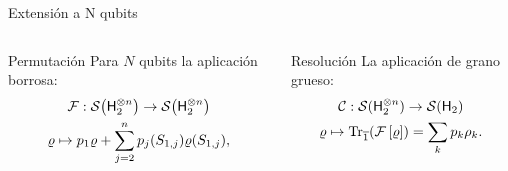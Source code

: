 \begin{frame}{Extensión a N qubits}
    \begin{columns}
        \begin{column}{0.5\textwidth}
            \begin{block}{Permutación}
            Para $N$ qubits la aplicación borrosa\pause:
            \begin{equation}
                \begin{gathered}
                \mathcal{F}:\mathcal{S}\qty( {\sf H}_{2}^{\otimes n})\to \mathcal{S}\qty( {\sf H}_{2}^{\otimes n})\nonumber\\
                \varrho \mapsto p_{1}\varrho+\sum_{j=2}^{n}p_{j}(S_{1,j})\varrho(S_{1,j}),\nonumber
            \end{gathered}\nonumber
        \end{equation}
    \end{block}
        \end{column}
        \pause
        \begin{column}{0.5\textwidth}
            \begin{block}{Resolución}
        La aplicación de grano grueso\pause:
        \begin{equation}
            \begin{gathered}
                \mathcal{C}:\mathcal{S}( {\sf H}_{2}^{\otimes n})\to \mathcal{S}({\sf H}_{2})\\
                \varrho\mapsto\Tr_{\overline{1}}(\mathcal{F}\left[\varrho\right]) = \sum_{k}p_{k}\rho_{k}.
            \end{gathered}\nonumber
        \end{equation}
    \end{block}
        \end{column}
    \end{columns}
\end{frame}


